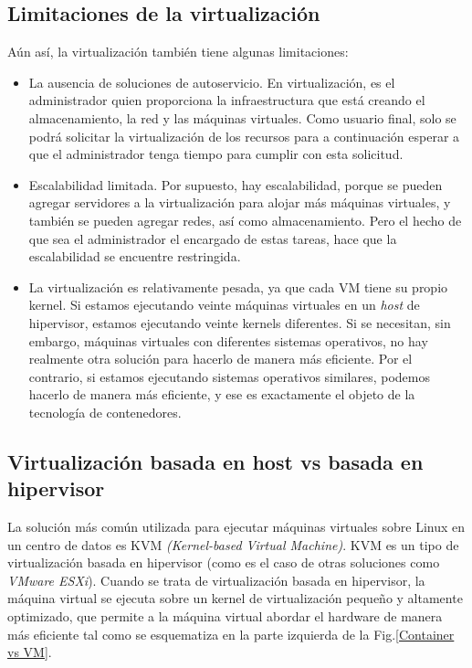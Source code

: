 \subsection{Limitaciones de la virtualización}
Aún así, la virtualización también tiene algunas limitaciones:
\begin{itemize}
\item 
La ausencia de soluciones de autoservicio. En virtualización, es el administrador quien proporciona la infraestructura que está creando el almacenamiento, la red y las máquinas virtuales. Como usuario final, solo se podrá solicitar la virtualización de los recursos para a continuación esperar a que el administrador tenga tiempo para cumplir con esta solicitud.
\end{itemize}
\begin{itemize}
\item 
Escalabilidad limitada. Por supuesto, hay escalabilidad, porque se pueden agregar servidores a la virtualización para alojar más máquinas virtuales, y también se pueden agregar redes, así como almacenamiento. Pero el hecho de que sea el administrador el encargado de estas tareas, hace que la escalabilidad se encuentre restringida. 
\end{itemize}
\begin{itemize}
\item 
La virtualización es relativamente pesada, ya que cada VM tiene su propio kernel. Si estamos ejecutando veinte máquinas virtuales en un \textit{host} de hipervisor, estamos ejecutando veinte kernels diferentes. Si se necesitan, sin embargo, máquinas virtuales con diferentes sistemas operativos, no hay realmente otra solución para hacerlo de manera más eficiente. Por el contrario, si estamos ejecutando sistemas operativos similares, podemos hacerlo de manera más eficiente, y ese es exactamente el objeto de la tecnología de contenedores.
\end{itemize}


\subsection{Virtualización basada en host vs basada en hipervisor}

La solución más común utilizada para ejecutar máquinas virtuales sobre Linux en un centro de datos es KVM \textit{ (Kernel-based Virtual Machine)}. KVM es un tipo de virtualización basada en hipervisor (como es el caso de otras soluciones como \textit{VMware ESXi}). Cuando se trata de  virtualización basada en hipervisor, la máquina virtual se ejecuta sobre un kernel de virtualización pequeño y altamente optimizado, que permite a la máquina virtual abordar el hardware de manera más eficiente tal como se esquematiza en la parte izquierda de la Fig.\ref{Container vs VM}.

